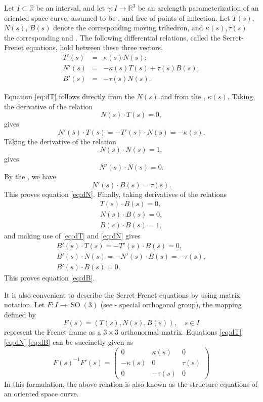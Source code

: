 \documentclass{article}
\newcommand{\reals}{\mathbb{R}}
\newcommand{\SO}{\operatorname{SO}}
\begin{document}
Let $I\subset\reals$ be an interval, and let $\gamma:I\to\reals^3$ be
an arclength parameterization of an oriented space curve, assumed to
be , and free of points of inflection.  Let $T(s)$, $N(s)$,
$B(s)$ denote the corresponding moving trihedron, and $\kappa(s),
\tau(s)$ the corresponding 
and .  The following
differential relations, called the Serret-Frenet equations, hold
between these three vectors.
\begin{eqnarray}
\label{eq:dT}
T'(s) &=& \kappa(s) N(s);\\
\label{eq:dN}
N'(s) &=& -\kappa(s) T(s) + \tau(s)B(s); \\
\label{eq:dB}
B'(s) &=& -\tau(s) N(s).
\end{eqnarray}

Equation \eqref{eq:dT} follows directly from the  $N(s)$ and from the , $\kappa(s)$. Taking the derivative of
the relation 
$$N(s)\cdot T(s) = 0,$$
gives
$$N'(s)\cdot T(s)  = - T'(s) \cdot N(s) = -\kappa(s).$$
Taking the derivative of the relation
$$N(s)\cdot N(s) = 1,$$
gives
$$N'(s) \cdot N(s) = 0.$$
By the , we have
$$N'(s)\cdot B(s) = \tau(s).$$
This proves equation \eqref{eq:dN}.
Finally,
taking derivatives of the relations
\begin{gather*}
T(s)\cdot B(s) = 0,\\
N(s)\cdot B(s) = 0,\\
B(s)\cdot B(s) =1,  
\end{gather*}
and making use of \eqref{eq:dT} and \eqref{eq:dN}
gives
\begin{gather*}
B'(s) \cdot T(s) = -T'(s)\cdot B(s) = 0,\\
B'(s) \cdot N(s) = -N'(s)\cdot B(s) = -\tau(s),\\
B'(s)\cdot B(s) = 0.  
\end{gather*}
This proves equation \eqref{eq:dB}.

It is also convenient to describe the Serret-Frenet equations by using
matrix notation.  Let $F:I \to \SO(3)$ (see - special orthogonal
group), the mapping defined by
$$F(s) = (T(s),N(s),B(s)),\quad s\in I$$
represent the Frenet frame as a $3\times 3$ orthonormal
matrix.  Equations \eqref{eq:dT} \eqref{eq:dN} \eqref{eq:dB} can be
succinctly given as
$$F(s)^{-1} F'(s) = 
\begin{pmatrix}
  0 & \kappa(s) & 0 \\
  -\kappa(s)  & 0 & \tau(s) \\
  0 & -\tau(s) & 0
\end{pmatrix}
$$
In this formulation, the above relation is also known as the structure
equations of an oriented space curve.
\end{document}
